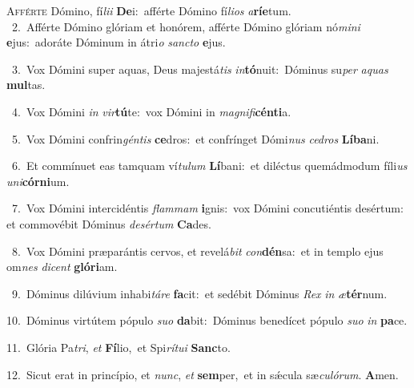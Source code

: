 \lettrine{\initial\textcolor{\initialcolor}{A}}{fférte} Dómino, fí\-\textit{li}\-\textit{i} \textbf{De}\-i:~\star afférte Dómino fí\-\textit{li}\-\textit{os} \textit{a}\-\textbf{rí}\textbf{e}tum.\\
{\numbfont\textcolor{\numbcolor}{~2.}}~Afférte Dómino glóriam et honórem, afférte Dómino glóriam nó\-\textit{mi}\-\textit{ni} \textbf{e}\-jus:~\star adoráte Dóminum in átri\textit{o} \textit{sanc}\-\textit{to} \textbf{e}\-jus.\par
{\numbfont\textcolor{\numbcolor}{~3.}}~Vox Dómini super aquas, Deus majestá\textit{tis} \textit{in}\-\textbf{tó}nuit:~\star Dóminus su\textit{per} \textit{a}\-\textit{quas} \textbf{mul}\-tas.\par
{\numbfont\textcolor{\numbcolor}{~4.}}~Vox Dómini \textit{in} \textit{vir}\-\textbf{tú}te:~\star vox Dómini in \textit{ma}\-\textit{gni}\textit{fi}\textbf{cén}\textbf{ti}a.\par
{\numbfont\textcolor{\numbcolor}{~5.}}~Vox Dómini confrin\-\textit{gén}\-\textit{tis} \textbf{ce}\-dros:~\star et confrínget Dómi\textit{nus} \textit{ce}\-\textit{dros} \textbf{Lí}\-\textbf{ba}ni.\par
{\numbfont\textcolor{\numbcolor}{~6.}}~Et commínuet eas tamquam ví\-\textit{tu}\-\textit{lum} \textbf{Lí}\-bani:~\star et diléctus quemádmodum fíli\textit{us} \textit{u}\-\textit{ni}\textbf{cór}\textbf{ni}um.\par
{\numbfont\textcolor{\numbcolor}{~7.}}~Vox Dómini intercidéntis \textit{flam}\-\textit{mam} \textbf{i}\-gnis:~\star vox Dómini concutiéntis desértum: et commovébit Dóminus \textit{de}\-\textit{sér}\textit{tum} \textbf{Ca}\-des.\par
{\numbfont\textcolor{\numbcolor}{~8.}}~Vox Dómini præparántis cervos, et revelá\textit{bit} \textit{con}\-\textbf{dén}sa:~\star et in templo ejus om\textit{nes} \textit{di}\-\textit{cent} \textbf{gló}\-\textbf{ri}am.\par
{\numbfont\textcolor{\numbcolor}{~9.}}~Dóminus dilúvium inhabi\-\textit{tá}\-\textit{re} \textbf{fa}\-cit:~\star et sedébit Dóminus \textit{Rex} \textit{in} \textit{æ}\-\textbf{tér}num.\par
{\numbfont\textcolor{\numbcolor}{10.}}~Dóminus virtútem pópulo \textit{su}\-\textit{o} \textbf{da}\-bit:~\star Dóminus benedícet pópulo \textit{su}\-\textit{o} \textit{in} \textbf{pa}\-ce.\par
{\numbfont\textcolor{\numbcolor}{11.}}~Glória Pa\-\textit{tri}\-, \textit{et} \textbf{Fí}\-lio,~\star et Spi\-\textit{rí}\-\textit{tu}\textit{i} \textbf{Sanc}\-to.\par
{\numbfont\textcolor{\numbcolor}{12.}}~Sicut erat in princípio, et \textit{nunc}\-, \textit{et} \textbf{sem}\-per,~\star et in sǽcula sæ\-\textit{cu}\-\textit{ló}\textit{rum}. \textbf{A}\-men.\par
